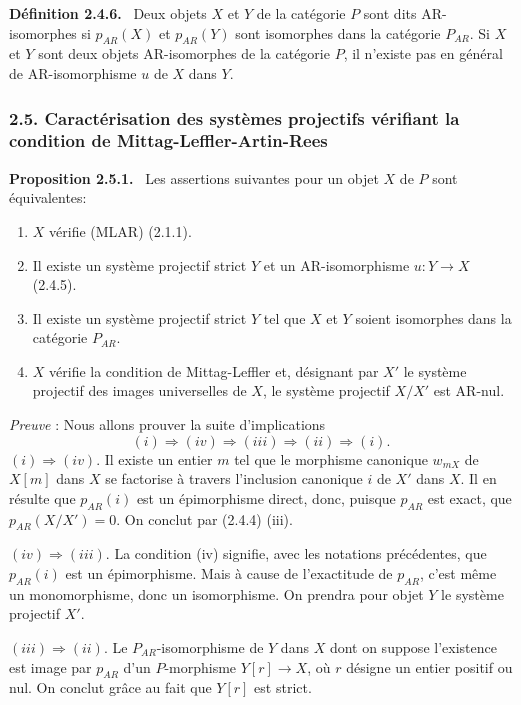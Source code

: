 \documentclass[11pt]{article}
\newenvironment{statement}[1]{\par\medskip\noindent\textbf{#1.}\ }{\par\medskip}
\begin{document}
\begin{statement}{Définition 2.4.6}
Deux objets $X$ et $Y$ de la catégorie $P$ sont dits AR-isomorphes si $p_{AR}(X)$ et $p_{AR}(Y)$ sont isomorphes dans la catégorie $P_{AR}$. Si $X$ et $Y$ sont deux objets AR-isomorphes de la catégorie $P$, il n'existe pas en général de AR-isomorphisme $u$ de $X$ dans $Y$.
\end{statement}

\subsubsection*{2.5. Caractérisation des systèmes projectifs vérifiant la condition de Mittag-Leffler-Artin-Rees}
\begin{statement}{Proposition 2.5.1}
Les assertions suivantes pour un objet $X$ de $P$ sont équivalentes:
\begin{enumerate}[label=(\roman*)]
\item $X$ vérifie (MLAR) (2.1.1).
\item Il
existe un système projectif strict $Y$ et un AR-isomorphisme $u:Y\to X$ (2.4.5).
\item Il existe un système projectif strict $Y$ tel que $X$ et $Y$ soient isomorphes dans la catégorie $P_{AR}$.
\item $X$ vérifie la condition de Mittag-Leffler et, désignant par $X'$ le système projectif des images universelles de $X$, le système projectif $X/X'$ est AR-nul.
\end{enumerate}
\end{statement}

\emph{Preuve} : Nous allons prouver la suite d'implications
\[
(i)\Rightarrow(iv)\Rightarrow(iii)\Rightarrow(ii)\Rightarrow(i).
\]
$(i)\Rightarrow(iv)$. Il existe un entier $m$ tel que le morphisme canonique $w_{mX}$ de $X[m]$ dans $X$ se factorise à travers l'inclusion canonique $i$ de $X'$ dans $X$. Il en résulte que $p_{AR}(i)$ est un épimorphisme direct, donc, puisque $p_{AR}$ est exact, que $p_{AR}(X/X')=0$. On conclut par (2.4.4) (iii).

$(iv)\Rightarrow(iii)$. La condition (iv) signifie, avec les notations précédentes, que $p_{AR}(i)$ est un épimorphisme. Mais à cause de l'exactitude de $p_{AR}$, c'est même un monomorphisme, donc un isomorphisme. On prendra pour objet $Y$ le système projectif $X'$.

$(iii)\Rightarrow(ii)$. Le $P_{AR}$-isomorphisme de $Y$ dans $X$ dont on suppose l'existence est image par $p_{AR}$ d'un $P$-morphisme $Y[r]\to X$, où $r$ désigne un entier positif ou nul. On conclut grâce au fait que $Y[r]$ est strict.
\end{document}
